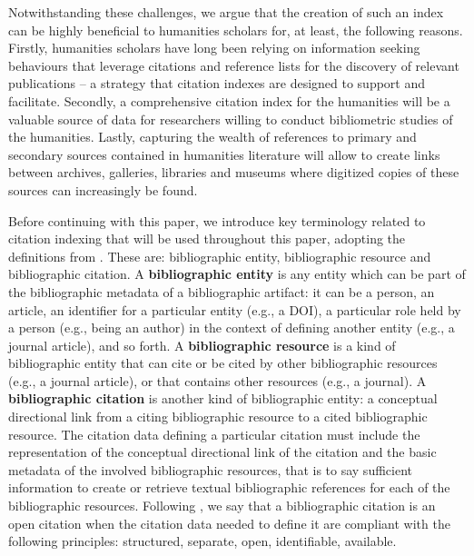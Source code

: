 Notwithstanding these challenges, we argue that the creation of such an index can be highly beneficial to humanities scholars for, at least, the following reasons. Firstly, humanities scholars have long been relying on information seeking behaviours that leverage citations and reference lists for the discovery of relevant publications -- a strategy that citation indexes are designed to support and facilitate. Secondly, a comprehensive citation index for the humanities will be a valuable source of data for researchers willing to conduct bibliometric studies of the humanities. Lastly, capturing the wealth of references to primary and secondary sources contained in humanities literature will allow to create links between archives, galleries, libraries and museums where digitized copies of these sources can increasingly be found.

Before continuing with this paper, we introduce key terminology related to citation indexing that will be used throughout this paper, adopting the definitions from \cite{peroni_opencitations_2018}. These are: bibliographic entity, bibliographic resource and bibliographic citation.
A \textbf{bibliographic entity} is any entity which can be part of the bibliographic metadata of a bibliographic artifact: it can be a person, an article, an identifier for a particular entity (e.g., a DOI), a particular role held by a person (e.g., being an author) in the context of defining another entity (e.g., a journal article), and so forth. A \textbf{bibliographic resource} is a kind of bibliographic entity that can cite or be cited by other bibliographic resources (e.g., a journal article), or that contains other  resources (e.g., a journal). A \textbf{bibliographic citation} is another kind of bibliographic entity: a conceptual directional link from a citing bibliographic resource to a cited bibliographic resource.
The citation data defining a particular citation must include the representation of the conceptual directional link of the citation and the basic metadata of the involved bibliographic resources, that is to say sufficient information to create or retrieve textual bibliographic references for each of the bibliographic resources. Following \cite{peroni_open_2018}, we say that a bibliographic citation is an open citation when the citation data needed to define it are compliant with the following principles: structured, separate, open, identifiable, available.

